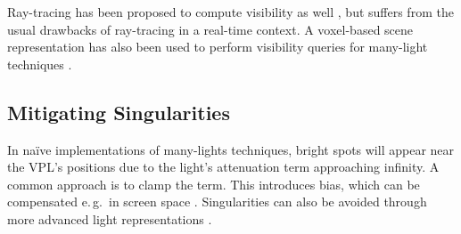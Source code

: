 Ray-tracing has been proposed to compute visibility as well \citep[e.\,g.][]{segovia2006bidirectional}, but suffers from the usual drawbacks of ray-tracing in a real-time context. A voxel-based scene representation has also been used to perform visibility queries for many-light techniques \citep{sun2015manylightsSVO}.


\subsection{Mitigating Singularities}
\label{sec:intro:relatedWorkManyLight:singularities}

In naïve implementations of many-lights techniques, bright spots will appear near the VPL’s positions due to the light’s attenuation term approaching infinity. A common approach is to clamp the term. This introduces bias, which can be compensated e.\,g.\ in screen space \citep{novak2011screen}. Singularities can also be avoided through more advanced light representations \citep{tokuyoshi2015vsgl}.


\cleardoublepage
